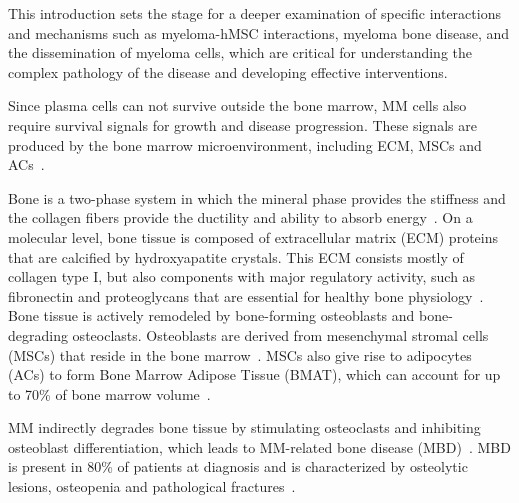 This introduction sets the stage for a deeper examination of specific
interactions and mechanisms such as myeloma-hMSC interactions, myeloma bone
disease, and the dissemination of myeloma cells, which are critical for
understanding the complex pathology of the disease and developing effective
interventions.



\label{sec:intro_myeloma_hMSC}
Since plasma cells can not survive outside the bone marrow, MM cells also
require survival signals for growth and disease progression. These signals are
produced by the bone marrow microenvironment, including ECM, MSCs and
ACs~\cite{kiblerAdhesiveInteractionsHuman1998,
    garcia-ortizRoleTumorMicroenvironment2021}.


\label{sec:intro_myeloma_bone}
Bone is a two-phase system in which the mineral phase provides the stiffness and
the collagen fibers provide the ductility and ability to absorb
energy~\cite{viguet-carrinRoleCollagenBone2006}. On a molecular level, bone
tissue is composed of extracellular matrix (ECM) proteins that are calcified by
hydroxyapatite crystals. This ECM consists mostly of collagen type I, but also
components with major regulatory activity, such as fibronectin and proteoglycans
that are essential for healthy bone
physiology~\cite{alcorta-sevillanoDecipheringRelevanceBone2020}. Bone tissue is
actively remodeled by bone-forming osteoblasts and bone-degrading osteoclasts.
Osteoblasts are derived from mesenchymal stromal cells (MSCs) that reside in the
bone marrow~\cite{friedensteinOsteogenesisTransplantsBone1966,
    pittengerMultilineagePotentialAdult1999}. MSCs also give rise to adipocytes
(ACs) to form Bone Marrow Adipose Tissue (BMAT), which can account for up to
70\% of bone marrow volume~\cite{fazeliMarrowFatBone2013}.

MM indirectly degrades bone tissue by stimulating osteoclasts and inhibiting
osteoblast differentiation, which leads to MM-related bone disease
(MBD)~\cite{glaveyProteomicCharacterizationHuman2017}. MBD is present in 80\% of
patients at diagnosis and is characterized by osteolytic lesions, osteopenia and
pathological fractures~\cite{terposPathogenesisBoneDisease2018}.


